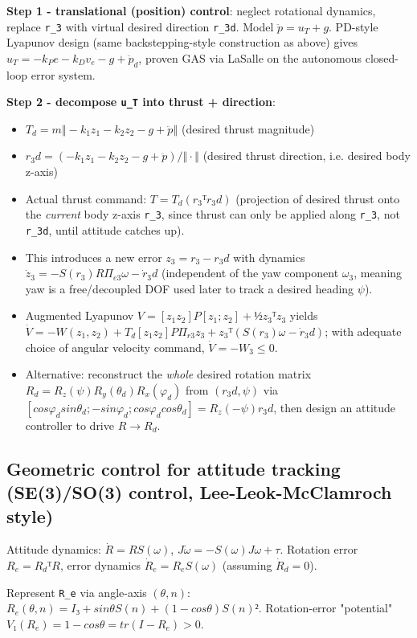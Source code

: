\documentclass[11pt]{article}
\begin{document}
\textbf{Step 1 - translational (position) control}: neglect rotational dynamics, replace \texttt{r\_\allowbreak{}3} with virtual desired direction \texttt{r\_\allowbreak{}3d}. Model $\ddot{p} = u_T + g$. PD-style Lyapunov design (same backstepping-style construction as above) gives $u_T = -k_P e - k_D v_e - g + \ddot{p}_d$, proven GAS via LaSalle on the autonomous closed-loop error system.

\textbf{Step 2 - decompose \texttt{u\_\allowbreak{}T} into thrust + direction}:
\begin{itemize}
\item $T_d = m‖-k_1z_1-k_2z_2-g+\ddot{p} ‖$ (desired thrust magnitude)
\item $r_3d = (-k_1z_1-k_2z_2-g+\ddot{p} )/‖·‖$ (desired thrust direction, i.e. desired body z-axis)
\item Actual thrust command: $T = T_d(r_3ᵀ r_3d)$ (projection of desired thrust onto the \textit{current} body z-axis \texttt{r\_\allowbreak{}3}, since thrust can only be applied along \texttt{r\_\allowbreak{}3}, not \texttt{r\_\allowbreak{}3d}, until attitude catches up).
\item This introduces a new error $z_3 = r_3 - r_3d$ with dynamics $\dot{z}_3 = -S(r_3)RΠ_{e3}ω - \dot{r}_3d$ (independent of the yaw component $ω_3$, meaning yaw is a free/decoupled DOF used later to track a desired heading $ψ $).
\item Augmented Lyapunov $V = [z_1 z_2]P[z_1;z_2] + ½z_3ᵀz_3$ yields $\dot{V} = -W(z_1,z_2) + T_d[z_1 z_2]PΠ_{r3}z_3 + z_3ᵀ(S(r_3)ω - \dot{r}_3d)$; with adequate choice of angular velocity command, $\dot{V} = -W_3 ≤ 0$.
\item Alternative: reconstruct the \textit{whole} desired rotation matrix $R_d = R_z(ψ )R_y(θ_d)R_x(φ_d)$ from $(r_3d, ψ )$ via $[cosφ_d sinθ_d; -sinφ_d; cosφ_d cosθ_d] = R_z(-ψ ) r_3d$, then design an attitude controller to drive $R → R_d$.
\end{itemize}

\subsection{Geometric control for attitude tracking (SE(3)/SO(3) control, Lee-Leok-McClamroch style)}
Attitude dynamics: $\dot{R} = RS(ω)$, $J\dot{ω} = -S(ω)Jω + τ$. Rotation error $R_e = R_dᵀR$, error dynamics $\dot{R}_e = R_e S(ω)$ (assuming $\dot{R}_d=0$).

Represent \texttt{R\_\allowbreak{}e} via angle-axis $(θ,n)$: $R_e(θ,n) = I₃ + sinθ S(n) + (1-cosθ)S(n)²$. Rotation-error "potential" $V₁(R_e) = 1-cosθ = tr(I-R_e) > 0$.
\end{document}
